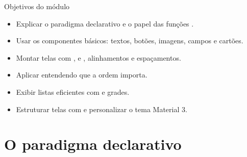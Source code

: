 \documentclass[aspectratio=169,10pt]{beamer}
\begin{document}
\capa

\begin{frame}{Objetivos do módulo}
  \begin{conceito}
    \begin{itemize}
      \item Explicar o paradigma declarativo e o papel das funções .
      \item Usar os componentes básicos: textos, botões, imagens, campos e cartões.
      \item Montar telas com ,  e , alinhamentos e espaçamentos.
      \item Aplicar  entendendo que a ordem importa.
      \item Exibir listas eficientes com  e grades.
      \item Estruturar telas com  e personalizar o tema Material 3.
    \end{itemize}
  \end{conceito}
\end{frame}

\sumario

\section{O paradigma declarativo}
\end{document}
